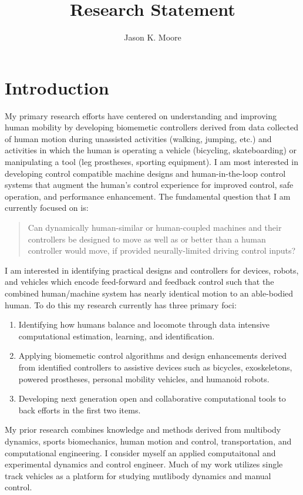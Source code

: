 \documentclass{article}
\title{Research Statement}
\author{Jason K. Moore}
\date{}
\begin{document}
\maketitle

\section*{Introduction}
%
My primary research efforts have centered on understanding and improving human
mobility by developing biomemetic controllers derived from data collected of
human motion during unassisted activities (walking, jumping, etc.) and
activities in which the human is operating a vehicle (bicycling, skateboarding)
or manipulating a tool (leg prostheses, sporting equipment). I am most
interested in developing control compatible machine designs and
human-in-the-loop control systems that augment the human's control experience
for improved control, safe operation, and performance enhancement. The
fundamental question that I am currently focused on is:
%
\begin{quote}
 Can dynamically human-similar or human-coupled machines and their controllers
 be designed to move as well as or better than a human controller would move,
 if provided neurally-limited driving control inputs?
\end{quote}

I am interested in identifying practical designs and controllers for devices,
robots, and vehicles which encode feed-forward and feedback control such that
the combined human/machine system has nearly identical motion to an able-bodied
human. To do this my research currently has three primary foci:
%
\begin{enumerate}
  \item Identifying how humans balance and locomote through data intensive
    computational estimation, learning, and identification.
  \item Applying biomemetic control algorithms and design enhancements derived
    from identified controllers to assistive devices such as bicycles,
    exoskeletons, powered prostheses, personal mobility vehicles, and humanoid
    robots.
  \item Developing next generation open and collaborative computational tools
    to back efforts in the first two items.
 \end{enumerate}

My prior research combines knowledge and methods derived from multibody
dynamics, sports biomechanics, human motion and control, transportation, and
computational engineering. I consider myself an applied computaitonal and
experimental dynamics and control engineer. Much of my work utilizes single
track vehicles as a platform for studying mutlibody dynamics and manual
control.
\end{document}
